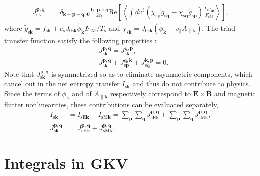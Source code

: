 \begin{align}
  J_{\mathrm{s}\bm{k}}^{\bm{p},\bm{q}} &= \delta_{\bm{k}+\bm{p}+\bm{q},\bm{0}} \frac{\bm{b} \cdot \bm{p} \times \bm{q}}{2c_b} \mathrm{Re} \left[ \left\langle \int dv^3 (\chi_{\mathrm{s}\bm{p}} \tilde{g}_{\mathrm{s}\bm{q}} - \chi_{\mathrm{s}\bm{q}} \tilde{g}_{\mathrm{s}\bm{p}}) \frac{T_\mathrm{s}\tilde{g}_{\mathrm{s}\bm{k}}}{F_\mathrm{sM}} \right\rangle \right], 
\end{align}
where $\tilde{g}_{\mathrm{s}\bm{k}} = \tilde{f}_{\mathrm{s}\bm{k}} + e_\mathrm{s} J_{0\mathrm{s}\bm{k}} \tilde{\phi}_{\bm{k}} F_\mathrm{sM} / T_\mathrm{s}$ and $\chi_{\mathrm{s}\bm{k}} = J_{0\mathrm{s}\bm{k}} (\tilde{\phi}_{\bm{k}} - v_\parallel \tilde{A}_{\parallel\bm{k}})$. The triad transfer function satisfy the following properties \cite{Nakata2012PoP}:
\begin{align}
  &J_{\mathrm{s}\bm{k}}^{\bm{p},\bm{q}} = J_{\mathrm{s}\bm{k}}^{\bm{q},\bm{p}}, \\
  &J_{\mathrm{s}\bm{k}}^{\bm{p},\bm{q}} + J_{\mathrm{s}\bm{p}}^{\bm{q},\bm{k}} + J_{\mathrm{s}\bm{q}}^{\bm{k},\bm{p}} = 0.
\end{align}
Note that $J_{\mathrm{s}\bm{k}}^{\bm{p},\bm{q}}$ is symmetrized so as to eliminate asymmetric components, which cancel out in the net entropy transfer $I_{\mathrm{s}\bm{k}}$ and thus do not contribute to physics. Since the terms of $\tilde{\phi}_{\bm{k}}$ and of $\tilde{A}_{\parallel\bm{k}}$ respectively correspond to $\bm{E}\times\bm{B}$ and magnetic flutter nonlinearities, these contributions can be evaluated separately,
\begin{align}
  I_{\mathrm{s}\bm{k}} &= I_{\mathrm{sE}\bm{k}} + I_{\mathrm{sM}\bm{k}} = \sum_{\bm{p}} \sum_{\bm{q}} J_{\mathrm{sE}\bm{k}}^{\bm{p},\bm{q}} + \sum_{\bm{p}} \sum_{\bm{q}} J_{\mathrm{sM}\bm{k}}^{\bm{p},\bm{q}}, \\
  J_{\mathrm{s}\bm{k}}^{\bm{p},\bm{q}} &= J_{\mathrm{sE}\bm{k}}^{\bm{p},\bm{q}} + J_{\mathrm{sM}\bm{k}}^{\bm{p},\bm{q}}.
\end{align}





\section{Integrals in GKV}
\label{sec:Integrals in GKV}

